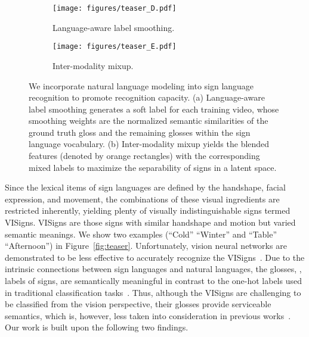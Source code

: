 \documentclass[10pt,twocolumn,letterpaper]{article}
\begin{document}
\begin{figure*}
     \centering
     \begin{subfigure}[b]{0.43\textwidth}
         \centering
         \texttt{[image: figures/teaser\_D.pdf]}
         \caption{Language-aware label smoothing.}
         \label{fig:teaser_D}
     \end{subfigure}
     \hfill
     \begin{subfigure}[b]{0.51\textwidth}
         \centering
         \texttt{[image: figures/teaser\_E.pdf]}
         \caption{Inter-modality mixup.}
         \label{fig:teaser_E}
     \end{subfigure}
\vspace{-3mm}
    \caption{We incorporate natural language modeling into sign language recognition to promote recognition capacity. (a) Language-aware label smoothing generates a soft label for each training video, whose smoothing weights are the normalized semantic similarities of the ground truth gloss and the remaining glosses within the sign language vocabulary. (b) Inter-modality mixup yields the blended features (denoted by orange rectangles) with the corresponding mixed labels to maximize the separability of signs in a latent space.}
    \vspace{-5mm}
    \label{fig:teaser_vl}
\end{figure*}

Since the lexical items of sign languages are defined by the handshape, facial expression, and movement, the combinations of these visual ingredients are restricted inherently, yielding plenty of visually indistinguishable signs termed VISigns. VISigns are those signs with similar handshape and motion but varied semantic meanings. We show two examples (``Cold'' \vs ``Winter'' and ``Table'' \vs ``Afternoon'') in Figure~\ref{fig:teaser}. Unfortunately, vision neural networks are demonstrated to be less effective to accurately recognize the VISigns~\cite{albanie2020bsl, li2020word, joze2019ms}. Due to the intrinsic connections between sign languages and natural languages, the glosses, \ie, labels of signs, are semantically meaningful in contrast to the one-hot labels used in traditional classification tasks~\cite{kay2017kinetics, imagenet}. 
Thus, although the VISigns are challenging to be classified from the vision perspective, their glosses provide
serviceable semantics, which is, however, less taken into consideration in previous works~\cite{hu2021hand, hu2021signbert, hu2021global, li2020transferring, li2020word, joze2019ms, jiang2021skeleton, jiang2021sign}. Our work is built upon the following two findings. 
\end{document}
